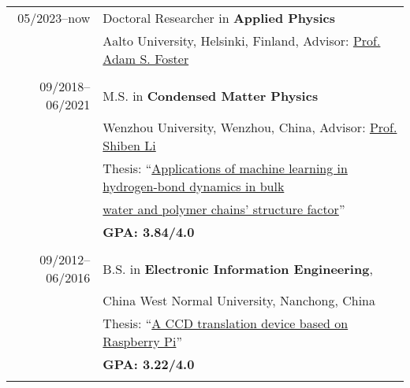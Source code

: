 \documentclass[a4paper,10pt]{article} %
\begin{document}
\begin{tabular}{r|l}	
05/2023--now 				    & Doctoral Researcher in \textbf{Applied Physics}\\
& Aalto University, Helsinki, Finland, Advisor: \href{https://scholar.google.fi/citations?user=I0n9QYcAAAAJ}{Prof. Adam S. Foster}\\
\multicolumn{2}{c}{} \\	%

09/2018--06/2021 				    & M.S. in \textbf{Condensed Matter Physics}\\
                                    & Wenzhou University, Wenzhou, China, Advisor: \href{https://slxy.wzu.edu.cn/lishiben.pdf}{Prof. Shiben Li}\\
                                    & Thesis: “\href{https://nbviewer.jupyter.org/github/HuangJiaLian/DataBase0/blob/master/uPic/2021_07_24_12_HuangJieBiYeDaBian.pdf}{Applications of machine learning in hydrogen-bond dynamics in bulk} \\& \href{https://nbviewer.jupyter.org/github/HuangJiaLian/DataBase0/blob/master/uPic/2021_07_24_12_HuangJieBiYeDaBian.pdf}{water and polymer chains’ structure factor}”\\
                                    & \textbf{GPA: 3.84/4.0}\\

%


\multicolumn{2}{c}{} \\	%

09/2012--06/2016                    & B.S. in \textbf{Electronic Information Engineering}, \\                    & China West Normal University, Nanchong, China\\
					 & Thesis: “\href{https://nbviewer.jupyter.org/github/HuangJiaLian/DataBase0/blob/master/uPic/2021_07_24_13_CCD_translation_device.pdf}{A CCD translation device based on Raspberry Pi}”	\\
					 & \textbf{GPA: 3.22/4.0}\\
\multicolumn{2}{c}{} \\	%
\end{tabular}
\end{document}

